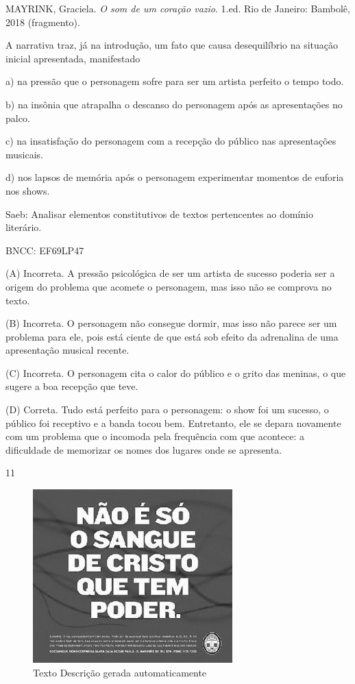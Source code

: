 MAYRINK, Graciela. \emph{O som de um coração vazio}. 1.ed. Rio de
Janeiro: Bambolê, 2018 (fragmento).

A narrativa traz, já na introdução, um fato que causa desequilíbrio na
situação inicial apresentada, manifestado

a) na pressão que o personagem sofre para ser um artista perfeito o
tempo todo.

b) na insônia que atrapalha o descanso do personagem após as
apresentações no palco.

c) na insatisfação do personagem com a recepção do público nas
apresentações musicais.

d) nos lapsos de memória após o personagem experimentar momentos de
euforia nos shows.

Saeb: Analisar elementos constitutivos de textos pertencentes ao domínio
literário.

BNCC: EF69LP47

(A) Incorreta. A pressão psicológica de ser um artista de sucesso
poderia ser a origem do problema que acomete o personagem, mas isso não
se comprova no texto.

(B) Incorreta. O personagem não consegue dormir, mas isso não parece ser
um problema para ele, pois está ciente de que está sob efeito da
adrenalina de uma apresentação musical recente.

(C) Incorreta. O personagem cita o calor do público e o grito das
meninas, o que sugere a boa recepção que teve.

(D) Correta. Tudo está perfeito para o personagem: o show foi um
sucesso, o público foi receptivo e a banda tocou bem. Entretanto, ele se
depara novamente com um problema que o incomoda pela frequência com que
acontece: a dificuldade de memorizar os nomes dos lugares onde se
apresenta.

\num{11}

\begin{figure}
\centering
\includegraphics[width=3.03125in,height=2.63521in]{./imgSAEB_8_POR/media/image36.png}
\caption{Texto Descrição gerada automaticamente}
\end{figure}

